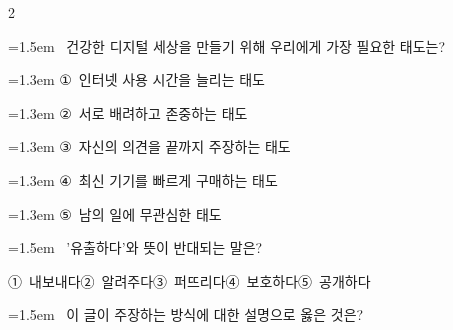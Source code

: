 \documentclass[11pt, a4paper]{article}
\begin{document}
\begin{multicols}{2}
\noindent\begin{minipage}{\columnwidth}
\vspace{2mm}
{\hangindent=1.5em  ~건강한 디지털 세상을 만들기 위해 우리에게 가장 필요한 태도는?\par}

\vspace{0.5mm}
{\hangindent=1.3em  \noindent\hspace{0.3em}①~인터넷 사용 시간을 늘리는 태도\par}
{\hangindent=1.3em  \noindent\hspace{0.3em}②~서로 배려하고 존중하는 태도\par}
{\hangindent=1.3em  \noindent\hspace{0.3em}③~자신의 의견을 끝까지 주장하는 태도\par}
{\hangindent=1.3em  \noindent\hspace{0.3em}④~최신 기기를 빠르게 구매하는 태도\par}
{\hangindent=1.3em  \noindent\hspace{0.3em}⑤~남의 일에 무관심한 태도\par}
\vspace{4mm}
\end{minipage}
\par

\noindent\begin{minipage}{\columnwidth}
\vspace{2mm}
{\hangindent=1.5em  ~'유출하다'와 뜻이 반대되는 말은?\par}

\vspace{0.5mm}
\noindent
\mbox{①~내보내다}\hspace{1em}\mbox{②~알려주다}\hspace{1em}\mbox{③~퍼뜨리다}\hspace{1em}\mbox{④~보호하다}\hspace{1em}\mbox{⑤~공개하다}

\vspace{4mm}
\end{minipage}
\par

\noindent\begin{minipage}{\columnwidth}
\vspace{2mm}
{\hangindent=1.5em  ~이 글이 주장하는 방식에 대한 설명으로 옳은 것은?\par}


\end{minipage}
\end{multicols}
\end{document}
